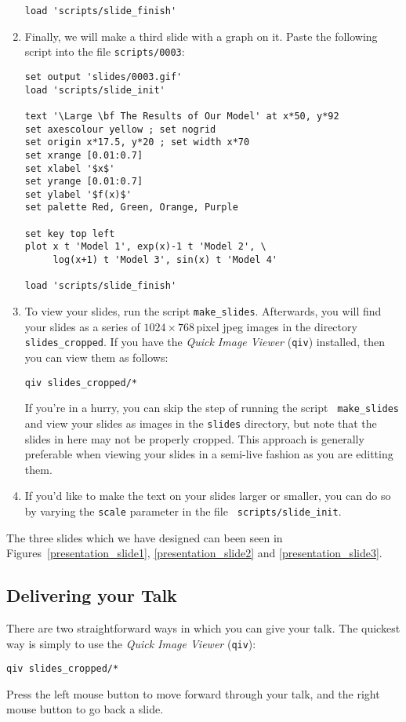 \begin{enumerate}
\begin{verbatim}
load 'scripts/slide_finish'
\end{verbatim}
\item Finally, we will make a third slide with a graph on it. Paste the
following script into the file {\tt scripts/0003}:
\begin{verbatim}
set output 'slides/0003.gif'
load 'scripts/slide_init'

text '\Large \bf The Results of Our Model' at x*50, y*92
set axescolour yellow ; set nogrid
set origin x*17.5, y*20 ; set width x*70
set xrange [0.01:0.7]
set xlabel '$x$'
set yrange [0.01:0.7]
set ylabel '$f(x)$'
set palette Red, Green, Orange, Purple

set key top left
plot x t 'Model 1', exp(x)-1 t 'Model 2', \
     log(x+1) t 'Model 3', sin(x) t 'Model 4'

load 'scripts/slide_finish'
\end{verbatim}
\item To view your slides, run the script {\tt make\_slides}. Afterwards, you
will find your slides as a series of $1024\times768$\,pixel jpeg images in the
directory {\tt slides\_cropped}.  If you have the {\it Quick Image
Viewer}\index{Quick Image Viewer} ({\tt qiv}) installed, then you can view them
as follows:
\begin{verbatim}
qiv slides_cropped/*
\end{verbatim}
If you're in a hurry, you can skip the step of running the script {\tt
make\_slides} and view your slides as images in the {\tt slides} directory, but
note that the slides in here may not be properly cropped. This approach is
generally preferable when viewing your slides in a semi-live fashion as you are
editting them.
\item If you'd like to make the text on your slides larger or smaller, you can
do so by varying the {\tt scale} parameter in the file {\tt
scripts/slide\_init}.
\end{enumerate}

The three slides which we have designed can been seen in
Figures~\ref{presentation_slide1}, \ref{presentation_slide2} and
\ref{presentation_slide3}.

\subsection{Delivering your Talk}

There are two straightforward ways in which you can give your talk. The
quickest way is simply to use the {\it Quick Image Viewer}\index{Quick Image
Viewer} ({\tt qiv}):
\begin{verbatim}
qiv slides_cropped/*
\end{verbatim}
Press the left mouse button to move forward through your talk, and the right
mouse button to go back a slide.

